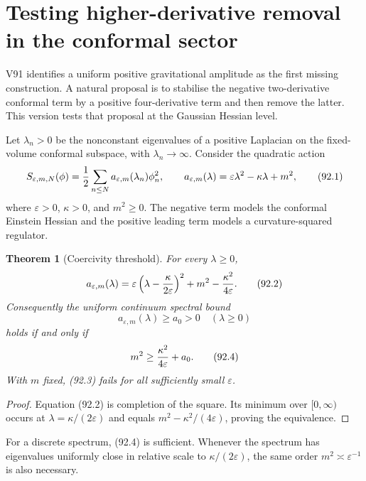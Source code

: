 \documentclass[11pt]{article}
\newtheorem{theorem}{Theorem}[section]
\begin{document}
\section{Testing higher-derivative removal in the conformal sector}
\label{sec:v11v92}

V91 identifies a uniform positive gravitational amplitude as the
first missing construction.  A natural proposal is to stabilise the
negative two-derivative conformal term by a positive four-derivative
term and then remove the latter.  This version tests that proposal at
the Gaussian Hessian level.

Let \(\lambda_n>0\) be the nonconstant eigenvalues of a positive
Laplacian on the fixed-volume conformal subspace, with
\(\lambda_n\to\infty\).  Consider the quadratic action
\[
 S_{\varepsilon,m,N}(\phi)
 ={1\over2}\sum_{n\le N}
       a_{\varepsilon,m}(\lambda_n)\phi_n^2,\qquad
 a_{\varepsilon,m}(\lambda)
       =\varepsilon\lambda^2-\kappa\lambda+m^2,              \tag{92.1}
\]
where \(\varepsilon>0\), \(\kappa>0\), and \(m^2\ge0\).
The negative term models the conformal Einstein Hessian and the
positive leading term models a curvature-squared regulator.

\begin{theorem}[Coercivity threshold]
\label{thm:v11v92-threshold}
For every \(\lambda\ge0\),
\[
 a_{\varepsilon,m}(\lambda)
 =\varepsilon\left(\lambda-{\kappa\over2\varepsilon}\right)^2
       +m^2-{\kappa^2\over4\varepsilon}.                    \tag{92.2}
\]
Consequently the uniform continuum spectral bound
\[
                         a_{\varepsilon,m}(\lambda)\ge a_0>0
                    \quad(\lambda\ge0)                      \tag{92.3}
\]
holds if and only if
\[
                         m^2\ge{\kappa^2\over4\varepsilon}+a_0.
                                                                    \tag{92.4}
\]
With \(m\) fixed, (92.3) fails for all sufficiently small
\(\varepsilon\).
\end{theorem}

\begin{proof}
Equation (92.2) is completion of the square.  Its minimum over
\([0,\infty)\) occurs at
\(\lambda=\kappa/(2\varepsilon)\) and equals
\(m^2-\kappa^2/(4\varepsilon)\), proving the equivalence.
\end{proof}

For a discrete spectrum, (92.4) is sufficient.  Whenever the spectrum
has eigenvalues uniformly close in relative scale to
\(\kappa/(2\varepsilon)\), the same order \(m^2\asymp\varepsilon^{-1}\)
is also necessary.
\end{document}
